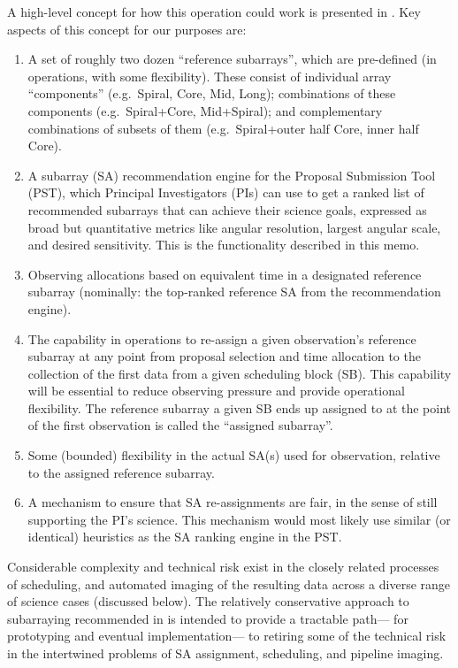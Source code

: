 \documentclass[11pt]{article}
\begin{document}
A high-level concept for how this operation could work is presented in
\citep{saNarrative}.  Key aspects of this concept for our purposes
are:
\begin{enumerate}
\item A set of roughly two dozen ``reference subarrays'', which are
  pre-defined (in operations, with some flexibility).  These consist
  of individual array ``components'' (e.g.\ Spiral, Core, Mid, Long);
  combinations of these components (e.g.\ Spiral+Core, Mid+Spiral);
  and complementary combinations of subsets of them (e.g.\
  Spiral+outer half Core, inner half Core).
\item A subarray (SA) recommendation engine for the Proposal
  Submission Tool (PST), which Principal Investigators (PIs) can use
  to get a ranked list of recommended subarrays that can achieve their
  science goals, expressed as broad but quantitative metrics like
  angular resolution, largest angular scale, and desired sensitivity.
  This is the functionality described in this memo.
\item Observing allocations based on equivalent time in a designated reference
  subarray (nominally: the top-ranked reference SA from the recommendation
  engine).
\item The capability in operations to re-assign a given
  observation's reference subarray at any point from proposal
  selection and time allocation to the collection of the first data
  from a given scheduling block (SB).  This capability will be
  essential to reduce observing pressure and provide operational
  flexibility.  The reference subarray a given SB ends up assigned to
  at the point of the first observation is called the ``assigned
  subarray''.
\item Some (bounded) flexibility in the actual SA(s) used for
  observation, relative to the assigned reference subarray.
\item A mechanism to ensure that SA re-assignments are fair, in the
  sense of still supporting the PI's science.  This mechanism would
  most likely use similar (or identical) heuristics as the SA ranking
  engine in the PST.
\end{enumerate}
Considerable complexity and technical risk exist in the closely
related processes of scheduling, and automated imaging of the
resulting data across a diverse range of science cases (discussed
below).  The relatively conservative approach to subarraying
recommended in \citep{saNarrative} is intended to provide a tractable
path--- for prototyping and eventual implementation--- to retiring
some of the technical risk in the intertwined problems of SA
assignment, scheduling, and pipeline imaging.
\end{document}
